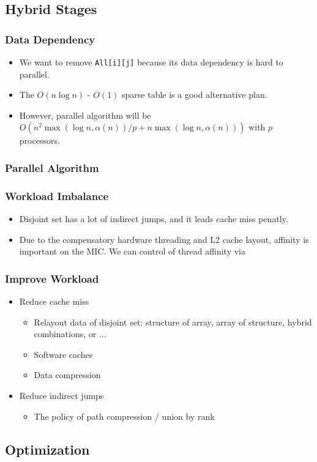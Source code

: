 \subsection{Hybrid Stages}
\begin{frame}
	\frametitle{Data Dependency}
	\begin{itemize}
		\setlength\itemsep{1em}
		\item We want to remove \texttt{All[i][j]} because its data dependency 
			is hard to parallel.
		\item The $O(n \log n)$ - $O(1)$ sparse table is a good alternative plan. 
		\item However, parallel algorithm will be $O(n^2 \max(\log n, \alpha(n)) / p + n \max(\log n, \alpha(n)))$ 
			with $p$ processors.
	\end{itemize}
\end{frame}

\begin{frame}
	\frametitle{Parallel Algorithm}
\end{frame}

\begin{frame}
	\frametitle{Workload Imbalance}
	\begin{itemize}
		\setlength\itemsep{1em}
		\item Disjoint set has a lot of indirect jumps, and it leads cache miss penatly.
		\item Due to the compensatory hardware threading and L2 cache layout, affinity 
			is important on the MIC. We can control of thread affinity via 
	\end{itemize}
\end{frame}

\begin{frame}
	\frametitle{Improve Workload}
	\begin{itemize}
		\setlength\itemsep{1em}
		\item Reduce cache miss
			\begin{itemize}
				\setlength\itemsep{1em}
			 	\item Relayout data of disjoint set: structure of array, 
			 		array of structure, hybrid combinations, or ...
			 	\item Software caches
			 	\item Data compression
			\end{itemize}
		\item Reduce indirect jumps
			\begin{itemize}
				\setlength\itemsep{1em}
				\item The policy of path compression / union by rank
			\end{itemize}
	\end{itemize}
\end{frame}

\subsection{Optimization}
\begin{frame}
	\frametitle{}
\end{frame}